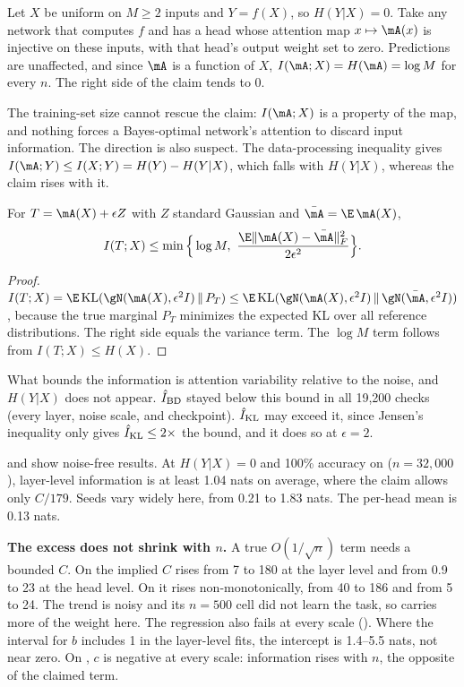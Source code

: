\begin{proposition}[Counterexample]
\label{prop:counter}
Let $X$ be uniform on $M\ge2$ inputs and $Y=f(X)$, so $H(Y|X)=0$. Take any network that computes $f$ and has a head whose attention map $x\mapsto\mA(x)$ is injective on these inputs, with that head's output weight set to zero. Predictions are unaffected, and since $\mA$ is a function of $X$, $I(\mA;X)=H(\mA)=\log M$ for every $n$. The right side of the claim tends to 0.
\end{proposition}

The training-set size cannot rescue the claim: $I(\mA;X)$ is a property of the map, and nothing forces a Bayes-optimal network's attention to discard input information. The direction is also suspect. The data-processing inequality gives $I(\mA;Y)\le I(X;Y)=H(Y)-H(Y|X)$, which falls with $H(Y|X)$, whereas the claim rises with it.

\begin{proposition}
\label{prop:variance}
For $T=\mA(X)+\epsilon Z$ with $Z$ standard Gaussian and $\bar\mA=\E\,\mA(X)$,
\begin{equation*}
I(T;X)\le\min\Big\{\log M,\ \frac{\E\|\mA(X)-\bar\mA\|_F^2}{2\epsilon^2}\Big\}.
\end{equation*}
\end{proposition}
\begin{proof}
$I(T;X)=\E\,\mathrm{KL}(\gN(\mA(X),\epsilon^2I)\,\|\,P_T)\le\E\,\mathrm{KL}(\gN(\mA(X),\epsilon^2I)\,\|\,\gN(\bar\mA,\epsilon^2I))$, because the true marginal $P_T$ minimizes the expected KL over all reference distributions. The right side equals the variance term. The $\log M$ term follows from $I(T;X)\le H(X)$.
\end{proof}

What bounds the information is attention variability relative to the noise, and $H(Y|X)$ does not appear. $\hat{I}_{\mathrm{BD}}$ stayed below this bound in all 19,200 checks (every layer, noise scale, and checkpoint). $\hat{I}_{\mathrm{KL}}$ may exceed it, since Jensen's inequality only gives $\hat{I}_{\mathrm{KL}}\le2\times$ the bound, and it does so at $\epsilon=2$.

  and  show noise-free results. At $H(Y|X)=0$ and 100\% accuracy on \order ($n=32{,}000$), layer-level information is at least 1.04 nats on average, where the claim allows only $C/179$. Seeds vary widely here, from 0.21 to 1.83 nats. The per-head mean is 0.13 nats.

{\bf The excess does not shrink with $n$.} A true $O(1/\sqrt n)$ term needs a bounded $C$. On \agnews the implied $C$ rises from 7 to 180 at the layer level and from 0.9 to 23 at the head level. On \order it rises non-monotonically, from 40 to 186 and from 5 to 24. The \order trend is noisy and its $n=500$ cell did not learn the task, so \agnews carries more of the weight here. The regression also fails at every scale (). Where the interval for $b$ includes 1 in the layer-level fits, the intercept is 1.4--5.5 nats, not near zero. On \agnews, $c$ is negative at every scale: information rises with $n$, the opposite of the claimed term.

